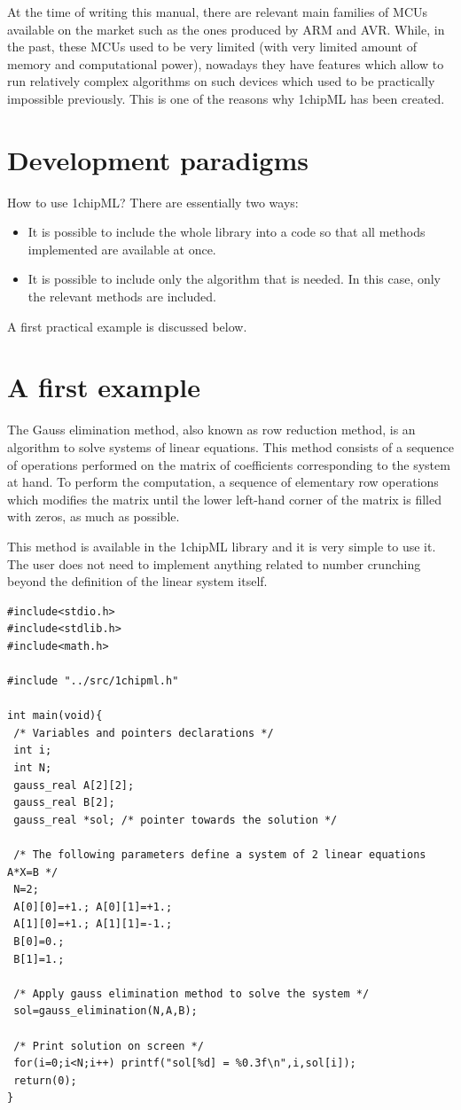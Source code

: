 \documentclass{book}
\begin{document}
At the time of writing this manual,  there  are  relevant  main families of MCUs available on the
market such as the ones produced by ARM and AVR.  While,  in the past, these MCUs used to be very
limited (with very limited amount of memory and computational power), nowadays they have features
which allow to run relatively complex algorithms on such devices which used     to be practically
impossible previously. This is one of the reasons why 1chipML has been created.


\section{Development paradigms}

How to use 1chipML? There are essentially two ways:
\begin{itemize}
 \item It is possible to include the whole library into a code so that all methods implemented are available at once.
 \item It is possible to include only the algorithm that is needed. In this case, only the relevant methods are included.
\end{itemize}

A first practical example is discussed below.

\section{A first example}

\lstset{language=C}

The Gauss elimination method, also known as row reduction method, is an algorithm  to       solve
systems of linear equations. This method consists  of  a  sequence of operations performed on the
matrix of coefficients corresponding to the system at hand.         To perform the computation, a
sequence of elementary row operations which modifies the matrix until  the lower left-hand corner
of the matrix is filled with zeros, as much as possible.

This method is available in the 1chipML library and it is very simple to use it.    The user does
not  need  to  implement anything related to number crunching beyond the definition of the linear
system itself.




\begin{lstlisting}
#include<stdio.h>
#include<stdlib.h>
#include<math.h>

#include "../src/1chipml.h"

int main(void){
 /* Variables and pointers declarations */
 int i;
 int N;
 gauss_real A[2][2];
 gauss_real B[2];
 gauss_real *sol; /* pointer towards the solution */

 /* The following parameters define a system of 2 linear equations A*X=B */
 N=2;
 A[0][0]=+1.; A[0][1]=+1.;
 A[1][0]=+1.; A[1][1]=-1.;
 B[0]=0.;
 B[1]=1.;

 /* Apply gauss elimination method to solve the system */
 sol=gauss_elimination(N,A,B);

 /* Print solution on screen */
 for(i=0;i<N;i++) printf("sol[%d] = %0.3f\n",i,sol[i]);
 return(0);
}
\end{lstlisting}
\end{document}
